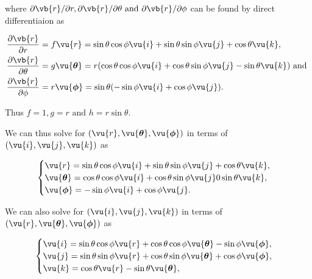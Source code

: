 \documentclass[english,a4paper,12pt]{report}
\begin{document}
where \(\partial \vb{r} /\partial r, \partial \vb{r} /\partial \theta \text { and } \partial \vb{r} /\partial \phi \) can be found by direct differentiaion as 

\begin{equation}
	\begin{aligned} 
		\frac{\partial \vb{r} }{\partial r}   &= f \vu{r} = \sin{\theta}\cos{\phi}\vu{i} + \sin{\theta}\sin{\phi}\vu{j} + \cos{\theta}\vu{k}, \\
		\frac{\partial \vb{r} }{\partial \theta }  &= g \vu{\boldsymbol{\theta }} = r(\cos{\theta}\cos{\phi}\vu{i} + \cos{\theta}\sin{\phi}\vu{j} - \sin{\theta}\vu{k})\text { and }  \\
		\frac{\partial \vb{r} }{\partial \phi }  &= r \vu{\boldsymbol{\phi } } = \sin \theta (-\sin{\phi}\vu{i} + \cos{\phi}\vu{j}). 
	\end{aligned} 
\end{equation}

Thus \(f = 1, g = r \text { and }  h = r\sin \theta \).

We can thus solve for \((\vu{r} , \vu{\boldsymbol{\theta } }, \vu{\boldsymbol{\phi } })\) in terms of \((\vu{i}, \vu{j} ,\vu{k} )\) as 

\begin{equation}
    \begin{cases}
        \vu{r} = \sin \theta \cos \phi  \vu{i}  + \sin \theta \sin \phi  \vu{j}  + \cos \theta  \vu{k},  \\
        \vu{\boldsymbol{\theta } } = \cos \theta \cos \phi \vu{i}  + \cos \theta \sin \phi \vu{j} 0 \sin \theta \vu{k}, \\
        \vu{\boldsymbol{\phi } } = -\sin \phi  \vu{i} + \cos \phi \vu{j}. 
    \end{cases}
\end{equation}



We can also solve for \((\vu{i} , \vu{j}, \vu{k} )\) in terms of \((\vu{r} , \vu{\boldsymbol{\theta } }, \vu{\boldsymbol{\phi } } )\) as  

\begin{equation}
    \begin{cases}
        \vu{i} = \sin \theta \cos \phi \vu{r} + \cos \theta \cos \phi \vu{\boldsymbol{\theta } } - \sin \phi \vu{\boldsymbol{\phi } }, \\
        \vu{j} = \sin \theta \sin \phi \vu{r} + \cos \theta \sin \phi \vu{\boldsymbol{\theta } } + \cos \phi \vu{\boldsymbol{\phi } }, \\
        \vu{k} = \cos \theta \vu{r} - \sin \theta \vu{\boldsymbol{\theta } },
    \end{cases}
\end{equation}
\end{document}
